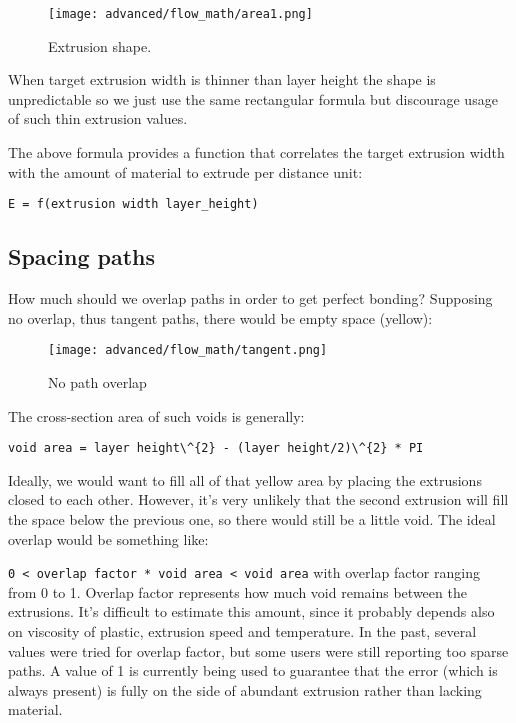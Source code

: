 \begin{figure}[H]
\centering
\texttt{[image: advanced/flow\_math/area1.png]}
\caption{Extrusion shape.}
\label{fig:area1}
\end{figure}

When target extrusion width is thinner than layer height the shape is unpredictable so we just use the same rectangular formula but discourage usage of such thin extrusion values.

The above formula provides a function that correlates the target extrusion width with the amount of material to extrude per distance unit:

\par \verb|E = f(extrusion width layer_height)|

\subsection{Spacing paths}
\label{sec:spacing_paths}

How much should we overlap paths in order to get perfect bonding?
Supposing no overlap, thus tangent paths, there would be empty space (yellow):

\begin{figure}[H]
\centering
\texttt{[image: advanced/flow\_math/tangent.png]}
\caption{No path overlap}
\label{fig:tangent}
\end{figure}

The cross-section area of such voids is generally:

\par \verb|void area = layer height\^{2} - (layer height/2)\^{2} * PI|

Ideally, we would want to fill all of that yellow area by placing the extrusions closed to each other. However, it's very unlikely that the second extrusion will fill the space below the previous one, so there would still be a little void. The ideal overlap would be something like:
\par \verb|0 < overlap factor * void area < void area|
with overlap factor ranging from 0 to 1. Overlap factor represents how much void remains between the extrusions. It's difficult to estimate this amount, since it probably depends also on viscosity of plastic, extrusion speed and temperature. In the past, several values were tried for overlap factor, but some users were still reporting too sparse paths. A value of 1 is currently being used to guarantee that the error (which is always present) is fully on the side of abundant extrusion rather than lacking material.

